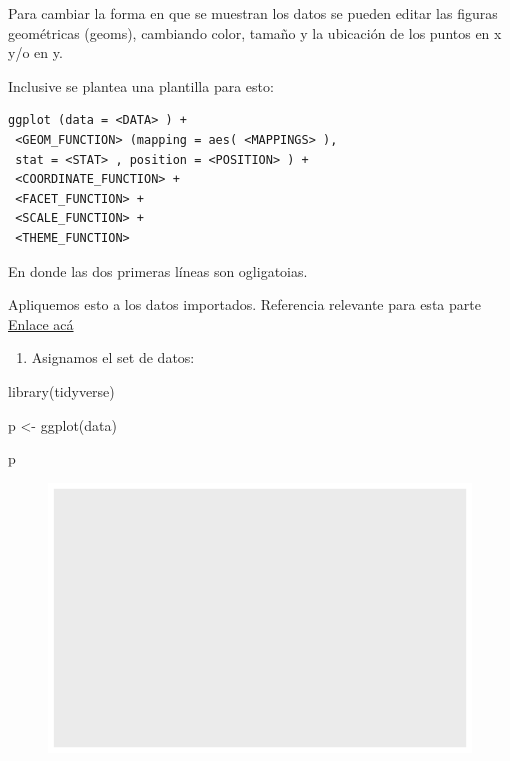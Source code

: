 \documentclass[
  letterpaper,
  DIV=11,
  numbers=noendperiod]{scrartcl}
\newenvironment{Shaded}{\begin{snugshade}}{\end{snugshade}}
\newcommand{\FunctionTok}[1]{\textcolor[rgb]{0.28,0.35,0.67}{#1}}
\newcommand{\NormalTok}[1]{\textcolor[rgb]{0.00,0.23,0.31}{#1}}
\newcommand{\OtherTok}[1]{\textcolor[rgb]{0.00,0.23,0.31}{#1}}
\providecommand{\tightlist}{%
  \setlength{\itemsep}{0pt}\setlength{\parskip}{0pt}}\usepackage{longtable,booktabs,array}
\begin{document}
Para cambiar la forma en que se muestran los datos se pueden editar las
figuras geométricas (geoms), cambiando color, tamaño y la ubicación de
los puntos en x y/o en y.

Inclusive se plantea una plantilla para esto:

\begin{verbatim}
ggplot (data = <DATA> ) +
 <GEOM_FUNCTION> (mapping = aes( <MAPPINGS> ),
 stat = <STAT> , position = <POSITION> ) +
 <COORDINATE_FUNCTION> +
 <FACET_FUNCTION> +
 <SCALE_FUNCTION> +
 <THEME_FUNCTION>
\end{verbatim}

En donde las dos primeras líneas son ogligatoias.

Apliquemos esto a los datos importados. Referencia relevante para esta
parte
\href{https://www.datanalytics.com/libro_r/elementos-de-un-grafico-en-ggplot2.html}{Enlace acá}

\begin{enumerate}
\def\labelenumi{\arabic{enumi}.}
\tightlist
\item
  Asignamos el set de datos:
\end{enumerate}

\begin{Shaded}
\begin{Highlighting}[]
\FunctionTok{library}\NormalTok{(tidyverse)}

\NormalTok{p }\OtherTok{\textless{}{-}} \FunctionTok{ggplot}\NormalTok{(data)}

\NormalTok{p}
\end{Highlighting}
\end{Shaded}

\begin{figure}[H]

{\centering \includegraphics{notebook_visualization_files/figure-pdf/unnamed-chunk-1-1.pdf}

}

\end{figure}
\end{document}
